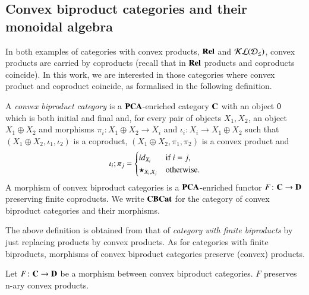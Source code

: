 \subsection{Convex biproduct categories and their monoidal algebra}\label{ssec:convexbiproduct} In both examples of categories with convex products, $\mathbf{Rel}$ and $\mathcal{KL}(\mathcal{D}_{\leq})$, convex products are carried by coproducts (recall that in $\mathbf{Rel}$ products and coproducts coincide). In this work, we are interested in those categories where convex product and coproduct coincide, as formalised in  the following definition.  

\begin{definition}\label{def:convbicat}%
A \emph{convex biproduct category} is a $\mathbf{PCA}$-enriched category $\mathbf{C}$ with an object $0$ which is both initial and final and, for every pair of objects $X_1,X_2$, an object $X_1\oplus X_2$ and morphisms $\pi_i \colon X_1\oplus X_2 \to X_i$ and $\iota_i \colon X_i \to X_1 \oplus X_2$ such that $(X_1\oplus X_2, \iota_1, \iota_2)$ is a coproduct, $(X_1\oplus X_2, \pi_1, \pi_2)$ is a convex product and
\begin{equation}\label{eq:delta}\iota_i; \pi_j = 
\begin{cases}  {id}_{X_i} & \text{if }i=j\text{,}\\
\star_{X_i,X_j} & \text{otherwise.}
\end{cases} \end{equation}
A morphism of convex biproduct categories is a $\mathbf{PCA}$-enriched functor $F\colon \mathbf{C} \to \mathbf{D}$ preserving finite coproducts. We write $\mathbf{CBCat}$ for the category of convex biproduct categories and their morphisms.
\end{definition}

The above definition is obtained from that of \emph{category with finite biproducts} by just replacing products by convex products.  As for categories with finite biproducts, morphisms of convex biproduct categories preserve (convex) products. %

 \begin{proposition}\label{prop:functor 1 e mezzo}
     Let $F\colon \mathbf{C}\to \mathbf{D}$ be a morphism between convex biproduct categories. 
     $F$ preserves n-ary convex products.
\end{proposition}

